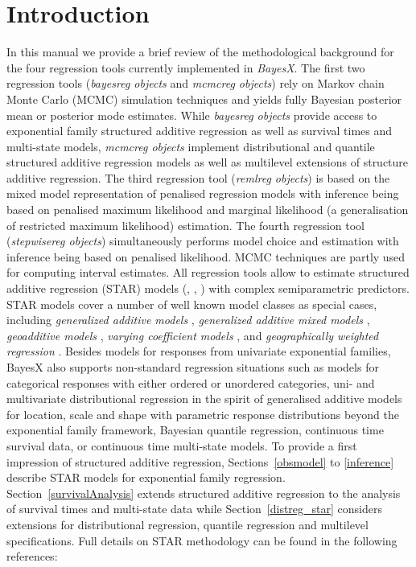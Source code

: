 \documentclass[11pt,a4paper,twoside]{bayesxarticle}
\begin{document}
\MakeShortVerb{\#}


\newpage

\section{Introduction}

In this manual we provide a brief review of the methodological background for the four regression tools currently implemented
in {\em BayesX}. The first two regression tools ({\em bayesreg objects} and {\em mcmcreg objects}) rely on Markov chain Monte Carlo (MCMC) simulation
techniques and yields fully Bayesian posterior mean or posterior mode estimates. While {\em bayesreg objects} provide access to exponential family structured additive regression as well as survival times and multi-state models, {\em mcmcreg objects} implement distributional and quantile structured additive regression models as well as multilevel extensions of structure additive regression.
The third regression tool ({\em remlreg objects}) is based on the mixed model representation of penalised regression models with inference being based on penalised
maximum likelihood and marginal likelihood (a generalisation of restricted maximum likelihood) estimation. The fourth regression
tool ({\em stepwisereg objects}) simultaneously performs model choice and estimation with inference being based on penalised
likelihood. MCMC techniques are partly used for computing interval estimates. All regression tools allow to estimate structured
additive regression (STAR) models (, , ) with complex semiparametric predictors.
STAR models cover a number of well
known model classes as special cases, including {\em generalized additive models} \cite{HasTib90}, {\em generalized additive
mixed models} \cite{LinZha99}, {\em geoadditive models} \cite{KamWan03}, {\em varying coefficient models} \cite{HasTib93}, and
{\em geographically weighted regression} . Besides models for responses from univariate exponential
families, BayesX also supports non-standard regression situations such as models for categorical responses with either ordered
or unordered categories, uni- and multivariate distributional regression in the spirit of generalised additive models for location, scale and shape with parametric response distributions beyond the exponential family framework, Bayesian quantile regression, continuous time survival data, or continuous time multi-state models. To provide a first impression of
structured additive regression, Sections~\ref{obsmodel} to \ref{inference} describe STAR models for exponential family
regression. Section~\ref{survivalAnalysis} extends structured additive regression to the analysis of survival times and
multi-state data while Section~\ref{distreg_star} considers extensions for distributional regression, quantile regression and multilevel specifications. Full details on STAR methodology can be found in the following references:
\end{document}
